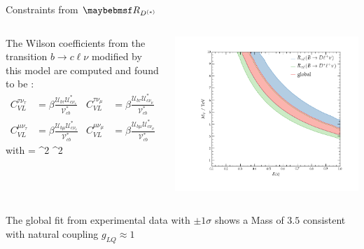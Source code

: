\documentclass[9pt,usenames,dvipsnames]{beamer}
\begin{document}
\begin{frame}{Constraints from $\RD$}
	\begin{columns}[c]
		The Wilson coefficients from the transition $ b\to c \ell \nu$ modified by this model are computed and found to be :
		\begin{align*}
			C^{\tau\nu_\tau}_{VL} &= \beta \frac{\mathcal U_{b\tau} \mathcal U^*_{c \nu_\tau}}{\mathcal{V}^*_{cb}} & C^{\tau \nu_\mu}_{VL} &= \beta \frac{\mathcal U_{b\tau} \mathcal U^*_{c \nu_\mu}}{\mathcal{V}^*_{cb}} \\
			C^{\mu\nu_\tau}_{VL} &= \beta \frac{\mathcal U_{b\mu} \mathcal U^*_{c \nu_\tau}}{\mathcal{V}^*_{cb}} & C^{\mu \nu_\mu}_{VL} &= \beta \frac{\mathcal U_{b\mu} \mathcal U^*_{c \nu_\mu}}{\mathcal{V}^*_{cb}}
		\end{align*}
		with
		\be 
		\beta = ^2\; ^2 \nonumber
		\ee
		\begin{center}
			\includegraphics[width= 1.1\textwidth]{./assets/fit_RD} 
		\end{center}
	\end{columns}
	The global fit from experimental data  with $\pm 1 \sigma$ shows a Mass of $3.5$ \TeV\xspace consistent with natural coupling $g_{LQ} \approx 1$
\end{frame}
\end{document}
